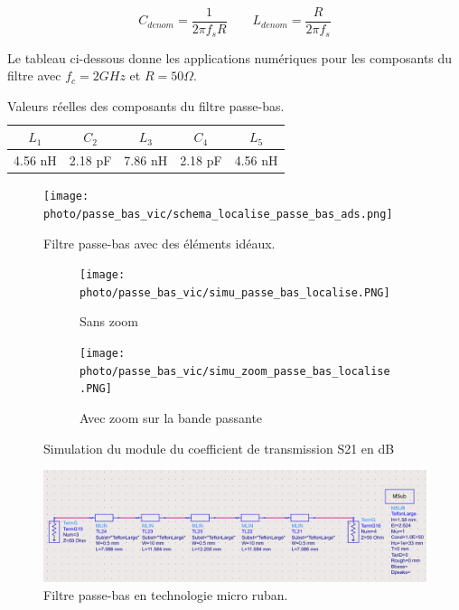 \documentclass[french]{article}
\begin{document}
\begin{equation}
	C_{denom} = \frac{1}{2\pi f_s R}
	\qquad
	L_{denom} = \frac{R}{2\pi f_s}
\end{equation}

Le tableau ci-dessous donne les applications numériques pour les composants du filtre avec $f_c = 2GHz$ et $R = 50\Omega$.

\begin{table}[H]
	\centering
	\begin{tabular}{|c|c|c|c|c|}
		\hline
		$L_1$ & $C_2$ & $L_3$ & $C_4$ & $L_5$\\
		\hline
		4.56 nH & 2.18 pF & 7.86 nH & 2.18 pF & 4.56 nH\\
		\hline
	\end{tabular}
	\caption{Valeurs réelles des composants du filtre passe-bas.}
	\label{tab:valeurs_composant_passe_bas}
\end{table}


\begin{figure}[H]
	\centering
	\texttt{[image: photo/passe\_bas\_vic/schema\_localise\_passe\_bas\_ads.png]}
	\caption{Filtre passe-bas avec des éléments idéaux.}
	\label{fig:schema_localise_passe_bas_ads}
\end{figure}


\begin{figure}[H]
	\centering
	\begin{subfigure}[b]{0.49\textwidth}
		\texttt{[image: photo/passe\_bas\_vic/simu\_passe\_bas\_localise.PNG]}
		\caption{Sans zoom}
		\label{fig:simu_passe_bas_localise}
	\end{subfigure}
	\begin{subfigure}[b]{0.49\textwidth}
		\texttt{[image: photo/passe\_bas\_vic/simu\_zoom\_passe\_bas\_localise.PNG]}
		\caption{Avec zoom sur la bande passante}
		\label{fig:simu_zoom_passe_bas_localise}
	\end{subfigure}
	\caption{Simulation du module du coefficient de transmission S21 en dB}
\end{figure}


\begin{figure}[H]
	\centering
	\includegraphics[width=15cm]{photo/passe_bas_vic/schema_distribue_passe_bas_ads.png}
	\caption{Filtre passe-bas en technologie micro ruban.}
	\label{fig:schema_distribue_passe_bas_ads}
\end{figure}
\end{document}
